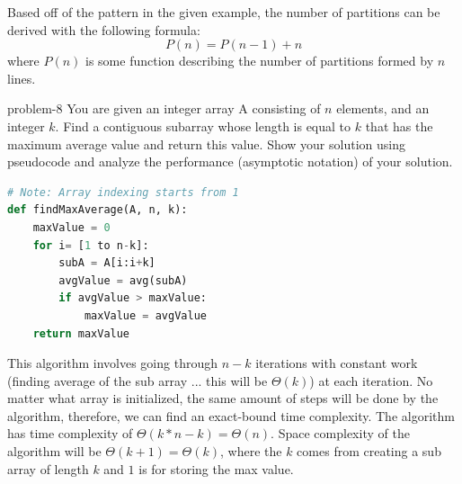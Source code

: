 \documentclass[letterpaper, 11pt]{extarticle}
\begin{document}
Based off of the pattern in the given example, the number of partitions can be derived with the following formula:
\[ P(n) = P(n-1) + n\]
where $P(n)$ is some function describing the number of partitions formed by $n$ lines.

\begin{algorithm}
    
\end{algorithm}


\begin{problem}{}{problem-8}
    You are given an integer array A consisting of $n$
    elements, and an integer $k$. Find a contiguous subarray whose length is equal to $k$ that has the maximum average value and return this value. Show your solution using pseudocode and analyze the performance (asymptotic notation) of your solution.
\end{problem}

\begin{lstlisting}[language=Python, basicstyle=\small\ttfamily]
# Note: Array indexing starts from 1
def findMaxAverage(A, n, k):    
    maxValue = 0
    for i= [1 to n-k]:
        subA = A[i:i+k]
        avgValue = avg(subA)
        if avgValue > maxValue:
            maxValue = avgValue
    return maxValue
\end{lstlisting}

This algorithm involves going through $n-k$ iterations with constant work (finding average of the sub array ... this will be $\Theta(k)$) at each iteration. No matter what array is initialized, the same amount of steps will be done by the algorithm, therefore, we can find an exact-bound time complexity. The algorithm has time complexity of $\Theta(k*n-k) = \Theta(n)$. Space complexity of the algorithm will be $\Theta(k+1) =\Theta(k)$, where the $k$ comes from creating a sub array of length $k$ and $1$ is for storing the max value.
\end{document}
